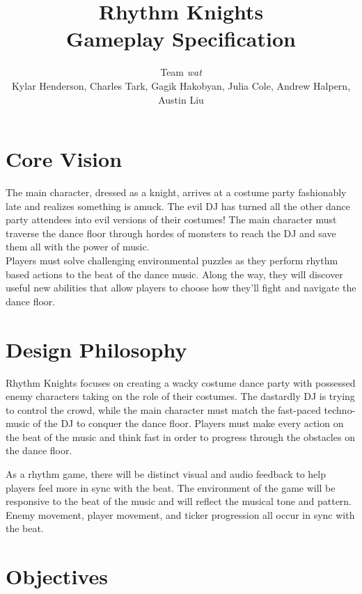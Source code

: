 \documentclass[]{article}
\begin{document}
\title{\textbf{Rhythm Knights} \\ Gameplay Specification}
\author{Team \emph{wat} \\
\small{Kylar Henderson, Charles Tark, 
Gagik Hakobyan, Julia Cole, Andrew Halpern, Austin Liu}}
\date{} %
\maketitle

\section*{Core Vision}

The main character, dressed as a knight, arrives at a costume party
fashionably late and realizes something is amuck. The evil DJ has
turned all the other dance party attendees into evil versions of their
costumes! The main character must traverse the dance floor through
hordes of monsters to reach the DJ and save them all with the power of
music. \\

Players must solve challenging environmental puzzles as they
perform rhythm based actions to the beat of the dance music. Along the
way, they will discover useful new abilities that allow players to
choose how they'll fight and navigate the dance floor.

\section*{Design Philosophy}

Rhythm Knights focuses on creating a wacky costume dance party with
possessed enemy characters taking on the role of their costumes. The
dastardly DJ is trying to control the crowd, while the main character
must match the fast-paced techno-music of the DJ to conquer the dance
floor. Players must make every action on the beat of the music and
think fast in order to progress through the obstacles on the dance
floor.

As a rhythm game, there will be distinct visual and audio feedback to
help players feel more in sync with the beat. The environment of the
game will be responsive to the beat of the music and will reflect the
musical tone and pattern. Enemy movement, player movement, and ticker
progression all occur in sync with the beat.

\section*{Objectives}
\end{document}
